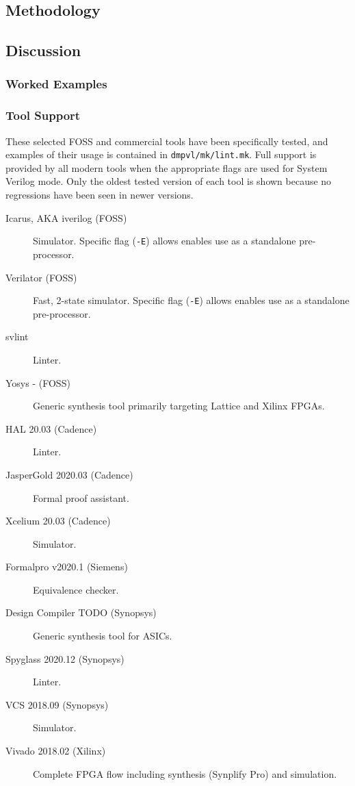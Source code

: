 \documentclass[a4paper]{article}
\begin{document}

\subsection{Methodology} %
\label{sec:BoringFlops_methodology}


\subsection{Discussion} %
\label{sec:BoringFlops_discussion}

\subsubsection{Worked Examples} %
\label{sec:BoringFlops_workedExamples}


\subsubsection{Tool Support} %
\label{sec:BoringFlops_toolSupport}
These selected \gls{FOSS} and commercial tools have been specifically tested,
and examples of their usage is contained in \texttt{dmpvl/mk/lint.mk}.
Full support is provided by all modern tools when the appropriate flags are
used for System Verilog mode.
Only the oldest tested version of each tool is shown because no regressions
have been seen in newer versions.

\begin{description}
\item[Icarus, AKA iverilog (\gls{FOSS})]
  Simulator.
  Specific flag (\texttt{-E}) allows enables use as a standalone pre-processor.
\item[Verilator (\gls{FOSS})]
  Fast, 2-state simulator.
  Specific flag (\texttt{-E}) allows enables use as a standalone pre-processor.
\item[svlint]
  Linter.
\item[Yosys - (\gls{FOSS})]
  Generic synthesis tool primarily targeting Lattice and Xilinx \glspl{FPGA}.
\item[HAL 20.03 (Cadence)]
  Linter.
\item[JasperGold 2020.03 (Cadence)]
  Formal proof assistant.
\item[Xcelium 20.03 (Cadence)]
  Simulator.
\item[Formalpro v2020.1 (Siemens)]
  Equivalence checker.
\item[Design Compiler TODO (Synopsys)]
  Generic synthesis tool for \glspl{ASIC}.
\item[Spyglass 2020.12 (Synopsys)]
  Linter.
\item[VCS 2018.09 (Synopsys)]
  Simulator.
\item[Vivado 2018.02 (Xilinx)]
  Complete \gls{FPGA} flow including synthesis (Synplify Pro) and simulation.
\end{description}
\end{document}
